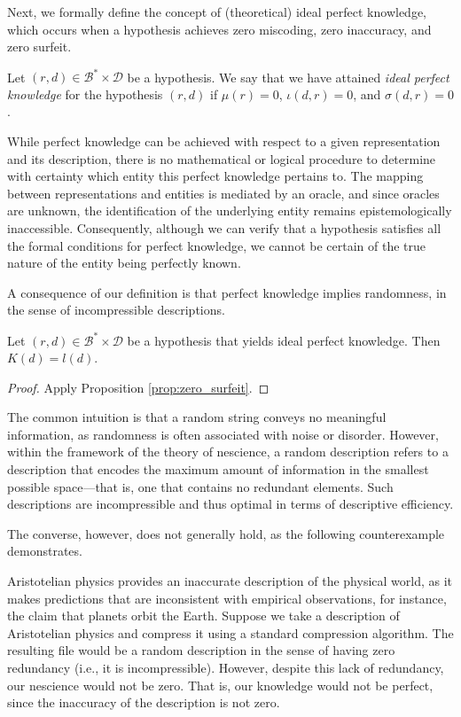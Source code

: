 Next, we formally define the concept of (theoretical) ideal perfect knowledge, which occurs when a hypothesis achieves zero miscoding, zero inaccuracy, and zero surfeit.

\begin{definition}
Let $(r, d) \in \mathcal{B}^\ast \times \mathcal{D}$ be a hypothesis. We say that we have attained \emph{ideal perfect knowledge} for the hypothesis $(r, d)$ if $\mu(r) = 0$, $\iota(d, r) = 0$, and $\sigma(d, r) = 0$.
\end{definition}

While perfect knowledge can be achieved with respect to a given representation and its description, there is no mathematical or logical procedure to determine with certainty which entity this perfect knowledge pertains to. The mapping between representations and entities is mediated by an oracle, and since oracles are unknown, the identification of the underlying entity remains epistemologically inaccessible. Consequently, although we can verify that a hypothesis satisfies all the formal conditions for perfect knowledge, we cannot be certain of the true nature of the entity being perfectly known.

A consequence of our definition is that perfect knowledge implies randomness, in the sense of incompressible descriptions.

\begin{proposition}
Let $(r, d) \in \mathcal{B}^\ast \times \mathcal{D}$ be a hypothesis that yields ideal perfect knowledge. Then $K(d) = l(d)$.
\end{proposition}
\begin{proof}
Apply Proposition \ref{prop:zero_surfeit}.
\end{proof}

The common intuition is that a random string conveys no meaningful information, as randomness is often associated with noise or disorder. However, within the framework of the theory of nescience, a random description refers to a description that encodes the maximum amount of information in the smallest possible space—that is, one that contains no redundant elements. Such descriptions are incompressible and thus optimal in terms of descriptive efficiency.

The converse, however, does not generally hold, as the following counterexample demonstrates.

\begin{example}
Aristotelian physics provides an inaccurate description of the physical world, as it makes predictions that are inconsistent with empirical observations, for instance, the claim that planets orbit the Earth. Suppose we take a description of Aristotelian physics and compress it using a standard compression algorithm. The resulting file would be a random description in the sense of having zero redundancy (i.e., it is incompressible). However, despite this lack of redundancy, our nescience would not be zero. That is, our knowledge would not be perfect, since the inaccuracy of the description is not zero.
\end{example}

